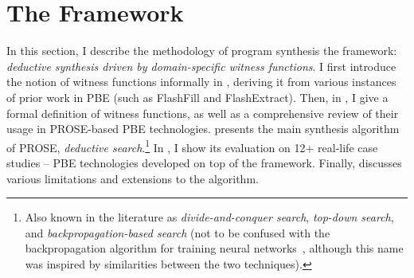 \chapter{The \PROSE Framework}
\label{ch:prose}

In this section, I describe the methodology of program synthesis the \PROSE framework: \emph{deductive synthesis
driven by domain-specific witness functions}.
I first introduce the notion of witness functions informally in , deriving it from various
instances of prior work in PBE (such as FlashFill and FlashExtract).
Then, in , I give a formal definition of witness functions, as well as a comprehensive review of
their usage in PROSE-based PBE technologies.
 presents the main synthesis algorithm of PROSE, \emph{deductive search}.\footnote{Also known
    in the literature as \emph{divide-and-conquer search}, \emph{top-down search}, and \emph{backpropagation-based
    search} (not to be confused with the backpropagation algorithm for training neural
    networks~\cite{chauvin1995backpropagation}, although this name was inspired by similarities between the two
techniques).}
In , I show its evaluation on 12+ real-life case studies -- PBE technologies developed on top
of the framework.
Finally,  discusses various limitations and extensions to the algorithm.






